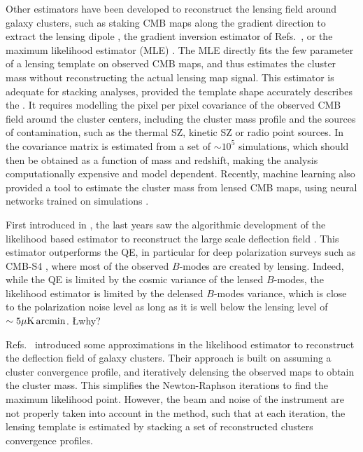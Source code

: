 \documentclass[prd, superscriptaddress, tightenlines, longbibliography, nofootinbib, eqsecnum, amsfonts, amsmath, floatfix, twocolumn, notitlepage]{revtex4-2}
\newcommand{\JC}[1]{\color{purple}{{JC:#1}}\color{black}\xspace}
\newcommand{\LL}[1]{{\color{orange}{LL: #1}}}
\begin{document}
Other estimators have been developed to reconstruct the lensing field around galaxy clusters, such as staking CMB maps along the gradient direction to extract the lensing dipole \cite{SPT:2019qkp}, the gradient inversion estimator of Refs.~\cite{Horowitz:2017iql, Hadzhiyska:2019cle}, or the maximum likelihood estimator (MLE) \cite{Lewis:2005fq,Baxter:2014frs, Raghunathan:2017cle}.
The MLE directly fits the few parameter of a lensing template on observed CMB maps, and thus estimates the cluster mass without reconstructing the actual lensing map signal. This estimator is adequate for stacking analyses, provided the template shape accurately describes the \LL{mass profile and the mass distribution around the cluser}. It requires modelling the pixel per pixel covariance of the observed CMB field around the cluster centers, including the cluster mass profile and the sources of contamination, such as the thermal SZ, kinetic SZ or radio point sources. In \cite{Raghunathan:2017cle} the covariance matrix is estimated from a set of $\sim 10^5$ simulations, which should then be obtained as a function of mass and redshift, making the analysis computationally expensive and model dependent. 
Recently, machine learning also provided a tool to estimate the cluster mass from lensed CMB maps, using neural networks trained on simulations \cite{Gupta:2020him}.


First introduced in \cite{Hirata:2002jy, Hirata:2003ka}, the last years saw the algorithmic development of the likelihood based estimator to reconstruct the large scale deflection field \cite{Carron:2017mqf,Millea:2017fyd,Millea:2020cpw, Millea:2021had,Legrand:2021qdu,Aurlien:2022tlp,Legrand:2023jne,Reinecke:2023gtp}.
This estimator outperforms the QE, in particular for deep polarization surveys such as CMB-S4 \cite{CMB-S4:2016ple}, where most of the observed $B$-modes are created by lensing. Indeed, while the QE is limited by the cosmic variance of the lensed $B$-modes, the likelihood estimator is limited by the delensed $B$-modes variance, which is close to the polarization noise level as long as it is well below the lensing level of $\sim 5\mu\rm K \, arcmin$\JC{This last bit does not seem quite right to me}. \L{why?}

Refs.~\cite{ Yoo:2008bf, Yoo:2010jd} introduced some approximations in the likelihood estimator to reconstruct the deflection field of galaxy clusters. Their approach is built on assuming a cluster convergence profile, and iteratively delensing the observed maps to obtain the cluster mass. This simplifies the Newton-Raphson iterations to find the maximum likelihood point. However, the beam and noise of the instrument are not properly taken into account in the method, such that at each iteration, the lensing template is estimated by stacking a set of reconstructed clusters convergence profiles. 
\end{document}
